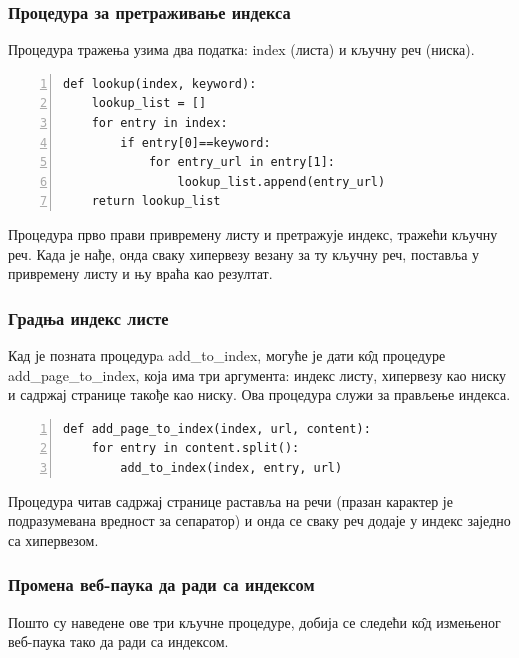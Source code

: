 \subsubsection{Процедура за претраживање индекса}

Процедура тражења узима два податка: index (листа) и кључну реч (ниска).

\begin{lstlisting}[caption=Процедура lookup, label={lst:lookup}, numbers=left]
def lookup(index, keyword):
    lookup_list = []
    for entry in index:
        if entry[0]==keyword:
            for entry_url in entry[1]:
                lookup_list.append(entry_url)
    return lookup_list
		\end{lstlisting}

Процедура прво прави привремену листу и претражује индекс, тражећи кључну реч. Када је нађе, онда сваку хипервезу везану за ту кључну реч, поставља у привремену листу и њу враћа као резултат.


\subsubsection{Градња индекс листе}

Кад је позната процедурa add\_to\_index, могуће је дати к\^{о}д процедуре\\ add\_page\_to\_index, која има три аргумента: индекс листу, хипервезу као ниску и садржај странице такође као ниску. Ова процедура служи за прављење индекса.

\begin{lstlisting}[caption=Процедура add\_page\_to\_index , label={lst:addpagetoindex}, numbers=left]
def add_page_to_index(index, url, content):
    for entry in content.split():
        add_to_index(index, entry, url)
		\end{lstlisting}

Процедура читав садржај странице раставља на речи (празан карактер је подразумевана вредност за сепаратор) и онда се сваку реч додаје у индекс заједно са хипервезом.

\subsubsection{Промена веб-паука да ради са индексом}
Пошто су наведене ове три кључне процедуре, добија се следећи к\^{о}д измењеног веб-паука тако да ради са индексом.

